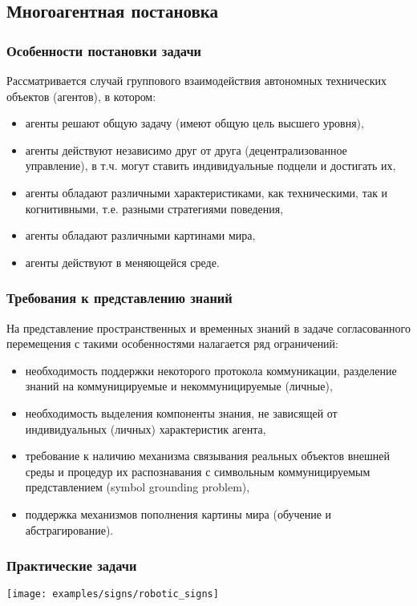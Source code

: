 \documentclass[default]{beamer}
\begin{document}
	\subsection{Многоагентная постановка}
	\begin{frame}
		\frametitle{Особенности постановки задачи}
		
		Рассматривается случай группового взаимодействия автономных технических объектов (агентов), в котором:
		\begin{itemize}
			\item агенты решают общую задачу (имеют общую цель высшего уровня),
			\item агенты действуют независимо друг от друга (децентрализованное управление), в т.ч. могут ставить индивидуальные подцели и достигать их,
			\item агенты обладают различными характеристиками, как техническими, так и когнитивными, т.е. разными стратегиями поведения,
			\item агенты обладают различными картинами мира,
			\item агенты действуют в меняющейся среде.
		\end{itemize}
		
	\end{frame}
	
	\begin{frame}
		\frametitle{Требования к представлению знаний}
		
		На представление пространственных и временных знаний в задаче согласованного перемещения с такими особенностями налагается ряд ограничений:
		\begin{itemize}
			\item необходимость поддержки некоторого протокола коммуникации, разделение знаний на коммуницируемые и некоммуницируемые (личные),
			\item необходимость выделения компоненты знания, не зависящей от индивидуальных (личных) характеристик агента,
			\item требование к наличию механизма связывания реальных объектов внешней среды и процедур их распознавания с символьным коммуницируемым представлением (symbol grounding problem),
			\item поддержка механизмов пополнения картины мира (обучение и абстрагирование).
		\end{itemize}
	\end{frame}

	\begin{frame}
		\frametitle{Практические задачи}
		
		\centering
		\texttt{[image: examples/signs/robotic\_signs]}

	\end{frame}
	
\end{document}
